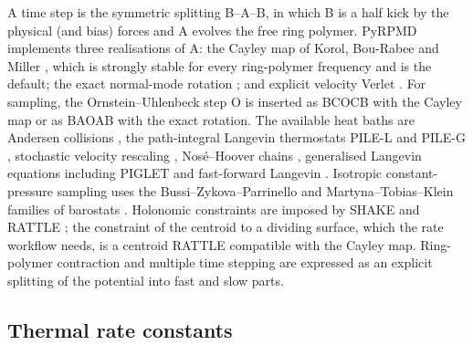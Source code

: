 \documentclass[preprint,12pt]{elsarticle}
\begin{document}
A time step is the symmetric splitting B--A--B, in which B is a half kick by the physical (and bias) forces and A evolves the free ring polymer. PyRPMD implements three realisations of A: the Cayley map of Korol, Bou-Rabee and Miller \cite{cayley19}, which is strongly stable for every ring-polymer frequency and is the default; the exact normal-mode rotation \cite{pile10}; and explicit velocity Verlet \cite{vv82}. For sampling, the Ornstein--Uhlenbeck step O is inserted as BCOCB \cite{bcocb20} with the Cayley map or as BAOAB \cite{baoab13} with the exact rotation. The available heat baths are Andersen collisions \cite{and80}, the path-integral Langevin thermostats PILE-L and PILE-G \cite{pile10}, stochastic velocity rescaling \cite{svr07}, Nos\'e--Hoover chains \cite{nhc92}, generalised Langevin equations including PIGLET \cite{gle09,piglet12} and fast-forward Langevin \cite{ffl18}. Isotropic constant-pressure sampling uses the Bussi--Zykova--Parrinello and Martyna--Tobias--Klein families of barostats \cite{bzp2009,mtk1994}. Holonomic constraints are imposed by SHAKE and RATTLE \cite{shake77,rattle83}; the constraint of the centroid to a dividing surface, which the rate workflow needs, is a centroid RATTLE compatible with the Cayley map. Ring-polymer contraction \cite{rpc08} and multiple time stepping \cite{respa92,mts16} are expressed as an explicit splitting of the potential into fast and slow parts.

\subsection{Thermal rate constants}
\end{document}
